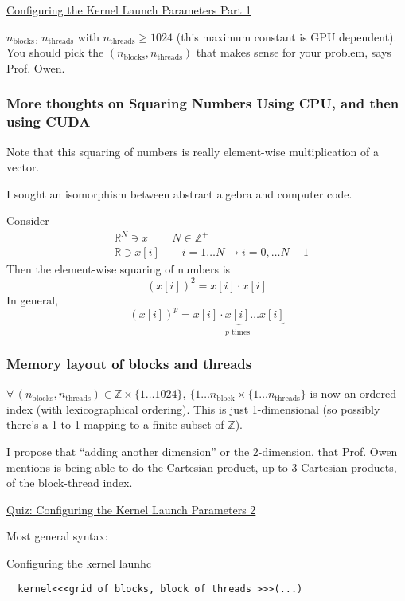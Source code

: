\documentclass[10pt]{amsart}
\begin{document}
\begin{multicols*}{2}
\href{https://classroom.udacity.com/courses/cs344/lessons/55120467/concepts/670742980923}{Configuring the Kernel Launch Parameters Part 1}

$n_{\text{blocks}}$, $n_{\text{threads}}$ with $n_{\text{threads}} \geq 1024$ (this maximum constant is GPU dependent).  You should pick the $(n_{\text{blocks}}, n_{\text{threads}})$ that makes sense for your problem, says Prof. Owen.  

\subsubsection{More thoughts on Squaring Numbers Using CPU, and then using CUDA}

Note that this squaring of numbers is really element-wise multiplication of a vector.

I sought an isomorphism between abstract algebra and computer code.

Consider
\[
\begin{aligned}
 &  \mathbb{R}^N \ni x \qquad \, N \in \mathbb{Z}^+ \\ 
 &  \mathbb{R} \ni x[i] \qquad i = 1 \dots N \to i = 0, \dots N-1 
  \end{aligned}
\]
Then the element-wise squaring of numbers is
\[
(x[i])^2 = x[i] \cdot x[i]
\]
In general,
\[
(x[i])^p = \underbrace{x[i]\cdot x[i] \dots x[i]}_{ p \text{ times } }
\]

\subsubsection{Memory layout of blocks and threads}

$\forall \, (n_{\text{blocks}}, n_{\text{threads}}) \in \mathbb{Z} \times \lbrace 1 \dots 1024 \rbrace$, $\lbrace 1 \dots n_{\text{block}} \times \lbrace 1 \dots n_{\text{threads}} \rbrace$ is now an ordered index (with lexicographical ordering).  This is just 1-dimensional (so possibly there's a 1-to-1 mapping to a finite subset of $\mathbb{Z}$).

I propose that ``adding another dimension'' or the 2-dimension, that Prof. Owen mentions is being able to do the Cartesian product, up to 3 Cartesian products, of the block-thread index.  

\href{https://classroom.udacity.com/courses/cs344/lessons/55120467/concepts/668398860923}{Quiz: Configuring the Kernel Launch Parameters 2 }

Most general syntax:

Configuring the kernel launhc
\begin{lstlisting}
  kernel<<<grid of blocks, block of threads >>>(...)


\end{lstlisting}
\end{multicols*}
\end{document}
